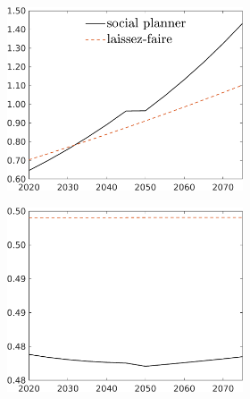 \begin{figure}[h!!]
\begin{subfigure}{1\textwidth}
\begin{subfigure}[]{0.32\textwidth}
\end{subfigure}
	\end{subfigure}	
	\begin{subfigure}{1\textwidth}		
	\caption{Laissez-faire and social planner allocation}
	\begin{subfigure}[]{0.32\textwidth}
		\includegraphics[width=1\textwidth]{../../codding_model/own_basedOnFried/optimalPol_010922_revision/figures/all_13Sept22_Tplus30/C_LFCompSP_T_regime4_knspil0_spillover0_noskill0_sep0_xgrowth0_PV1_etaa0.79_lgd1.png}
	\end{subfigure}	
	\begin{subfigure}[]{0.32\textwidth}
		\includegraphics[width=1\textwidth]{../../codding_model/own_basedOnFried/optimalPol_010922_revision/figures/all_13Sept22_Tplus30/hh_LFCompSP_T_regime4_knspil0_spillover0_noskill0_sep0_xgrowth0_PV1_etaa0.79_lgd0.png}

\end{subfigure}
\end{subfigure}
\end{figure}
